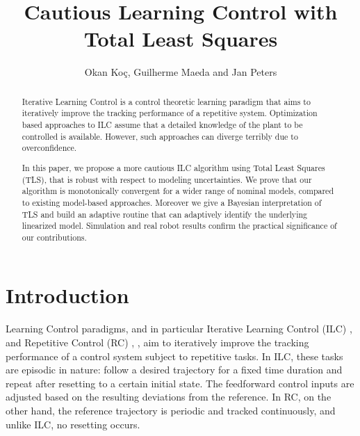 \documentclass[10pt,a4paper]{article}
\author{Okan Ko\c c, Guilherme Maeda and Jan Peters}
\title{Cautious Learning Control with Total Least Squares}
\theoremstyle{plain}
\theoremstyle{definition}
\begin{document}
\maketitle
\thispagestyle{empty}
\pagestyle{empty}

\begin{abstract}

Iterative Learning Control is a control theoretic learning paradigm that aims to iteratively improve the tracking performance of a repetitive system. Optimization based approaches to ILC assume that a detailed knowledge of the plant to be controlled is available. However, such approaches can diverge terribly due to overconfidence. 

In this paper, we propose a more cautious ILC algorithm using Total Least Squares (TLS), that is robust with respect to modeling uncertainties. We prove that our algorithm is monotonically convergent for a wider range of nominal models, compared to existing model-based approaches. Moreover we give a Bayesian interpretation of TLS and build an adaptive routine that can adaptively identify the underlying linearized model. Simulation and real robot results confirm the practical significance of our contributions. %
\end{abstract}



\section{Introduction}

Learning Control paradigms, and in particular Iterative Learning Control (ILC) \cite{Arimoto84}, \cite{Bristow06} and Repetitive Control (RC) \cite{Wang09}, \cite{Longman2000}, aim to iteratively improve the tracking performance of a control system subject to repetitive tasks. In ILC, these tasks are episodic in nature: follow a desired trajectory for a fixed time duration and repeat after resetting to a certain initial state. The feedforward control inputs are adjusted based on the resulting deviations from the reference. In RC, on the other hand, the reference trajectory is periodic and tracked continuously, and unlike ILC, no resetting occurs.
\end{document}
